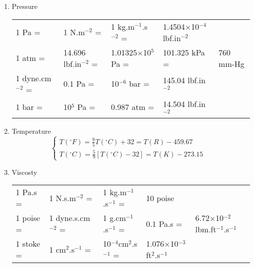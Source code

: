 \documentclass[12pts,a4paper,amsmath,amssymb,floatfix]{article}%
\newcommand{\frc}{\displaystyle\frac}
\begin{document}
\begin{enumerate}[1)]
\item Pressure %
     \begin{center}
     \begin{tabular}{|l l l l l|}
       \hline
       1 Pa =& 1 N.m$^{-2}$ =& 1 kg.m$^{-1}$.s$^{-2}$ =& 1.4504$\times$10$^{-4}$ lbf.in$^{-2}$ & \\
       1 atm =& 14.696 lbf.in$^{-2}$ =& 1.01325$\times$10$^{5}$ Pa =& 101.325 kPa =& 760 mm-Hg \\
       1 dyne.cm$^{-2}$ =& 0.1 Pa =& 10$^{-6}$ bar =& 145.04 lbf.in$^{-2}$ & \\
       1 bar =& 10$^{5}$ Pa =& 0.987 atm =& 14.504 lbf.in$^{-2}$ & \\
       \hline           
     \end{tabular}
     \end{center}
     
\item Temperature %
     \begin{displaymath}
       \begin{cases}
         T\left(^{\circ}F\right) = \frc{9}{5}T\left(^{\circ}C\right) + 32 = T(R) - 459.67 & \\
         T\left(^{\circ}C\right) = \frc{5}{9}\left[T\left(^{\circ}C\right)-32\right] = T(K) - 273.15 & 
       \end{cases}      
     \end{displaymath}
     
\item Viscosty %
     \begin{center}
     \begin{tabular}{|l l l l l|}
       \hline
       1 Pa.s =& 1 N.s.m$^{-2}$ =& 1 kg.m$^{-1}$.s$^{-1}$ =& 10 poise &   \\
       1 poise =& 1 dyne.s.cm$^{-2}$ =& 1 g.cm$^{-1}$.s$^{-1}$ =& 0.1 Pa.s =& 6.72$\times$10$^{-2}$ lbm.ft$^{-1}$.s$^{-1}$\\
       1 stoke =& 1 cm$^{2}$.s$^{-1}$ =& 10$^{-4}$cm$^{2}$.s$^{-1}$ =& 1.076$\times$10$^{-3}$ ft$^{2}$.s$^{-1}$ & \\
       \hline           
     \end{tabular}
     \end{center}

\end{enumerate}      
     
\end{document}
